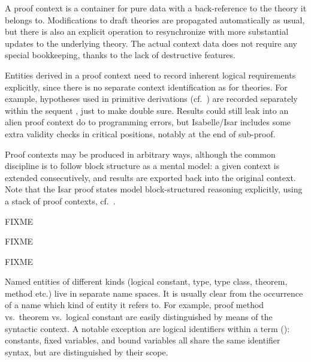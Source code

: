 \begin{isabellebody}
\begin{isamarkuptext}
  A proof context is a container for pure data with a back-reference
  to the theory it belongs to.  Modifications to draft theories are
  propagated automatically as usual, but there is also an explicit
   operation to resynchronize with more substantial
  updates to the underlying theory.  The actual context data does not
  require any special bookkeeping, thanks to the lack of destructive
  features.

  Entities derived in a proof context need to record inherent logical
  requirements explicitly, since there is no separate context
  identification as for theories.  For example, hypotheses used in
  primitive derivations (cf.\ ) are recorded
  separately within the sequent \isa{{\isasymGamma}\ {\isasymturnstile}\ {\isasymphi}}, just to make double
  sure.  Results could still leak into an alien proof context do to
  programming errors, but Isabelle/Isar includes some extra validity
  checks in critical positions, notably at the end of sub-proof.

  Proof contexts may be produced in arbitrary ways, although the
  common discipline is to follow block structure as a mental model: a
  given context is extended consecutively, and results are exported
  back into the original context.  Note that the Isar proof states
  model block-structured reasoning explicitly, using a stack of proof
  contexts, cf.\ .%
\end{isamarkuptext}%
\isamarkuptrue%
%
\isadelimmlref
%
\endisadelimmlref
%
\isatagmlref
%
\begin{isamarkuptext}%
FIXME%
\end{isamarkuptext}%
\isamarkuptrue%
%
\endisatagmlref
{\isafoldmlref}%
%
\isadelimmlref
%
\endisadelimmlref
%
\isamarkuptrue%
%
\begin{isamarkuptext}%
FIXME%
\end{isamarkuptext}%
\isamarkuptrue%
%
\isadelimmlref
%
\endisadelimmlref
%
\isatagmlref
%
\begin{isamarkuptext}%
FIXME%
\end{isamarkuptext}%
\isamarkuptrue%
%
\endisatagmlref
{\isafoldmlref}%
%
\isadelimmlref
%
\endisadelimmlref
%
\isamarkuptrue%
%
\begin{isamarkuptext}%
%
\end{isamarkuptext}%
\isamarkuptrue%
%
\isamarkuptrue%
%
\begin{isamarkuptext}%
Named entities of different kinds (logical constant, type,
type class, theorem, method etc.) live in separate name spaces.  It is
usually clear from the occurrence of a name which kind of entity it
refers to.  For example, proof method  vs.\ theorem
 vs.\ logical constant  are easily
distinguished by means of the syntactic context.  A notable exception
are logical identifiers within a term (): constants,
fixed variables, and bound variables all share the same identifier
syntax, but are distinguished by their scope.


\end{isamarkuptext}
\end{isabellebody}
